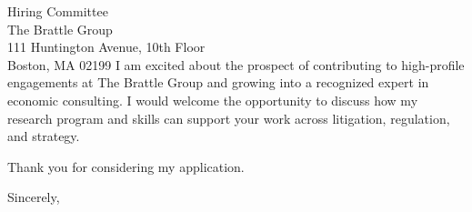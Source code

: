 \documentclass[11pt,letterpaper]{letter}
\begin{document}
\begin{letter}{Hiring Committee \\
The Brattle Group \\
111 Huntington Avenue, 10th Floor \\
Boston, MA 02199}
I am excited about the prospect of contributing to high-profile engagements at The Brattle Group and growing into a recognized expert in economic consulting. I would welcome the opportunity to discuss how my research program and skills can support your work across litigation, regulation, and strategy.

Thank you for considering my application.

\closing{Sincerely,}

\end{letter}
\end{document}
